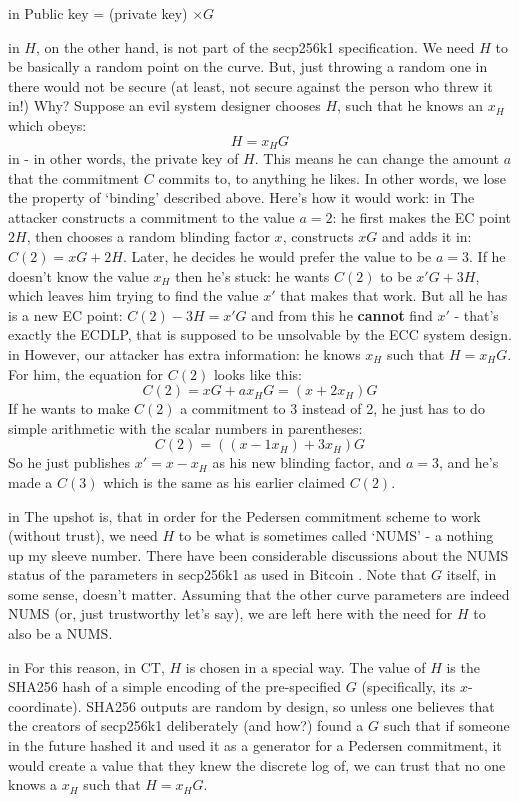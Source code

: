 \documentclass[10pt,a4paper]{article}
\begin{document}
 in \noindent Public key = (private key) $\times G$

 in \noindent $H$, on the other hand, is not part of the secp256k1 specification. We need $H$ to be basically a random point on the curve. But, just throwing a random one in there would not be secure (at least, not secure against the person who threw it in!) Why? Suppose an evil system designer chooses $H$, such that he knows an $x_H$ which obeys:
\[H = x_H G \]
 in \noindent - in other words, the private key of $H$. This means he can change the amount $a$ that the commitment $C$ commits to, to anything he likes. In other words, we lose the property of `binding' described above. Here's how it would work:
 in \noindent The attacker constructs a commitment to the value $a=2$: he first makes the EC point $2H$, then chooses a random blinding factor $x$, constructs $xG$ and adds it in: $C(2) = xG + 2H$. Later, he decides he would prefer the value to be $a=3$. If he doesn't know the value $x_H$ then he's stuck: he wants $C(2)$ to be $x'G + 3H$, which leaves him trying to find the value $x'$ that makes that work. But all he has is a new EC point: $C(2)-3H = x'G$ and from this he \textbf{cannot} find $x'$ - that's exactly the ECDLP, that is supposed to be unsolvable by the ECC system design.
 in \noindent However, our attacker has extra information: he knows $x_H$ such that $H = x_H G$. For him, the equation for $C(2)$ looks like this:
\[C(2) = xG + ax_{H}G = \left(x+2x_{H}\right)G \]
If he wants to make $C(2)$ a commitment to 3 instead of 2, he just has to do simple arithmetic with the scalar numbers in parentheses:
\[C(2) = \left(\left(x-1x_{H}\right) + 3x_{H}\right)G \]
So he just publishes $x' = x-x_H$ as his new blinding factor, and $a=3$, and he's made a $C(3)$ which is the same as his earlier claimed $C(2)$.

 in \noindent The upshot is, that in order for the Pedersen commitment scheme to work (without trust), we need $H$ to be what is sometimes called `NUMS' - a nothing up my sleeve number. There have been considerable discussions about the NUMS status of the parameters in secp256k1 as used in Bitcoin \cite{secp256k1_nums}. Note that $G$ itself, in some sense, doesn't matter. Assuming that the other curve parameters are indeed NUMS (or, just trustworthy let's say), we are left here with the need for $H$ to also be a NUMS.

 in \noindent For this reason, in CT, $H$ is chosen in a special way. The value of $H$ is the SHA256 hash of a simple encoding of the pre-specified $G$ (specifically, its $x$-coordinate). SHA256 outputs are random by design, so unless one believes that the creators of secp256k1 deliberately (and how?) found a $G$ such that if someone in the future hashed it and used it as a generator for a Pedersen commitment, it would create a value that they knew the discrete log of, we can trust that no one knows a $x_H$ such that $H = x_H  G$.
\end{document}
